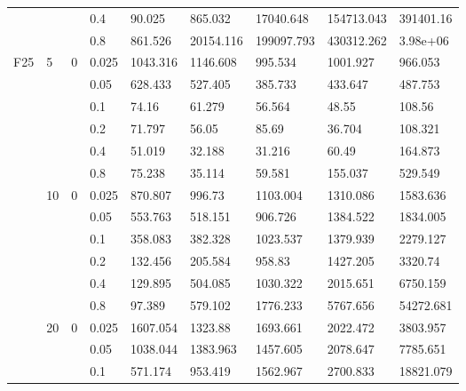 \begin{longtable}{|l|l|l|l|l|l|l|l|l|}
\cmidrule{4-9} &     &          & 0.4            & 90.025     & 865.032    & 17040.648  & 154713.043 & 391401.16  \\
\cmidrule{4-9} &     &          & 0.8            & 861.526    & 20154.116  & 199097.793 & 430312.262 & 3.98e+06   \\ \midrule
F25            & 5   & 0        & 0.025          & 1043.316   & 1146.608   & 995.534    & 1001.927   & 966.053    \\
\cmidrule{4-9} &     &          & 0.05           & 628.433    & 527.405    & 385.733    & 433.647    & 487.753    \\
\cmidrule{4-9} &     &          & 0.1            & 74.16      & 61.279     & 56.564     & 48.55      & 108.56     \\
\cmidrule{4-9} &     &          & 0.2            & 71.797     & 56.05      & 85.69      & 36.704     & 108.321    \\
\cmidrule{4-9} &     &          & 0.4            & 51.019     & 32.188     & 31.216     & 60.49      & 164.873    \\
\cmidrule{4-9} &     &          & 0.8            & 75.238     & 35.114     & 59.581     & 155.037    & 529.549    \\
\cmidrule{2-9} & 10  & 0        & 0.025          & 870.807    & 996.73     & 1103.004   & 1310.086   & 1583.636   \\
\cmidrule{4-9} &     &          & 0.05           & 553.763    & 518.151    & 906.726    & 1384.522   & 1834.005   \\
\cmidrule{4-9} &     &          & 0.1            & 358.083    & 382.328    & 1023.537   & 1379.939   & 2279.127   \\
\cmidrule{4-9} &     &          & 0.2            & 132.456    & 205.584    & 958.83     & 1427.205   & 3320.74    \\
\cmidrule{4-9} &     &          & 0.4            & 129.895    & 504.085    & 1030.322   & 2015.651   & 6750.159   \\
\cmidrule{4-9} &     &          & 0.8            & 97.389     & 579.102    & 1776.233   & 5767.656   & 54272.681  \\
\cmidrule{2-9} & 20  & 0        & 0.025          & 1607.054   & 1323.88    & 1693.661   & 2022.472   & 3803.957   \\
\cmidrule{4-9} &     &          & 0.05           & 1038.044   & 1383.963   & 1457.605   & 2078.647   & 7785.651   \\
\cmidrule{4-9} &     &          & 0.1            & 571.174    & 953.419    & 1562.967   & 2700.833   & 18821.079  \\

\end{longtable}
